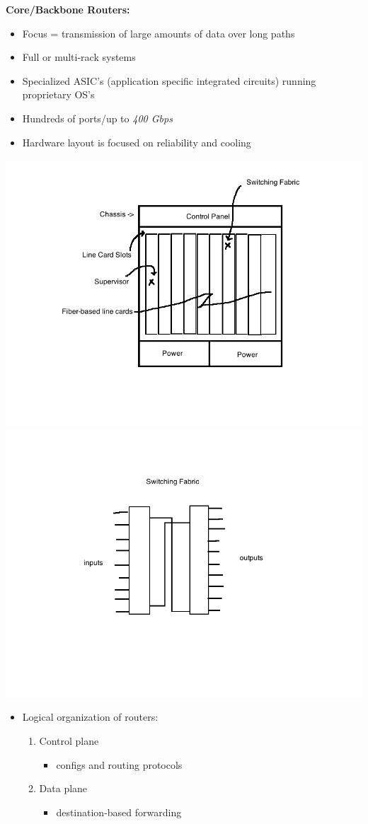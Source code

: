 \documentclass[11pt]{article}
\begin{document}
\textbf{Core/Backbone Routers:}
\begin{itemize}
\item Focus = transmission of large amounts of data over long paths
\item Full or multi-rack systems
\item Specialized ASIC's (application specific integrated circuits)
running proprietary OS's
\item Hundreds of ports/up to \emph{400 Gbps}
\item Hardware layout is focused on reliability and cooling
\end{itemize}
\includegraphics[width=.9\linewidth]{diagrams/corerouter.png} \\
\includegraphics[width=.9\linewidth]{diagrams/switchingfabric.png}

\begin{itemize}
\item Logical organization of routers:
\begin{enumerate}
\item Control plane
\begin{itemize}
\item configs and routing protocols
\end{itemize}
\item Data plane
\begin{itemize}
\item destination-based forwarding
\end{itemize}
\end{enumerate}
\end{itemize}
\end{document}
